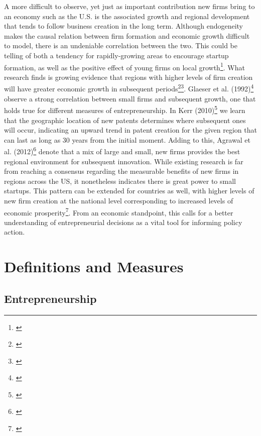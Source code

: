 A more difficult to observe, yet just as important contribution new firms bring to an economy such as the U.S. is the associated growth and regional development that tends to follow business creation in the long term. Although endogeneity makes the causal relation between firm formation and economic growth difficult to model, there is an undeniable correlation between the two. This could be telling of both a tendency for rapidly-growing areas to encourage startup formation, as well as the positive effect of young firms on local growth\footnote{\cite{ChatterjiGlaeserKerr2014}}. What research finds is growing evidence that regions with higher levels of firm creation will have greater economic growth in subsequent periods\footnote{\cite{GartnerShaverCarterReynolds2004}}\hspace{.2em}\footnote{\cite{AcsArmington2006}}. Glaeser et al. (1992)\footnote{\cite{GlaeserKallalScheinkmanShleifer1992}} observe a strong correlation between small firms and subsequent growth, one that holds true for different measures of entrepreneurship. In Kerr (2010)\footnote{\cite{Kerr2010}} we learn that the geographic location of new patents determines where subsequent ones will occur, indicating an upward trend in patent creation for the given region that can last as long as 30 years from the initial moment. Adding to this, Agrawal et al. (2012)\footnote{\cite{AgrawalCockburnGalassoOettl2012}} denote that a mix of large and small, new firms provides the best regional environment for subsequent innovation. While existing research is far from reaching a consensus regarding the measurable benefits of new firms in regions across the US, it nonetheless indicates there is great power to small startups. This pattern can be extended for countries as well, with higher levels of new firm creation at the national level corresponding to increased levels of economic prosperity\footnote{\cite{GartnerShaverCarterReynolds2004}}. From an economic standpoint, this calls for a better understanding of entrepreneurial decisions as a vital tool for informing policy action. 

\section{Definitions and Measures}

\subsection{Entrepreneurship}

